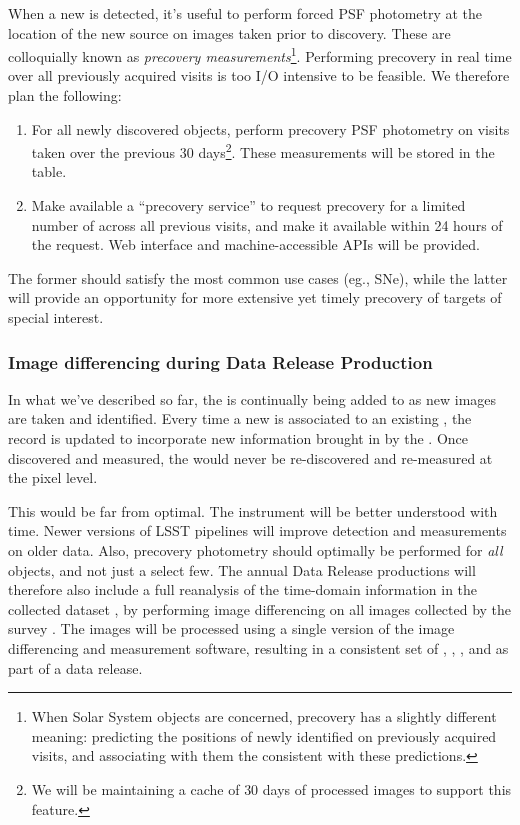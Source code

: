 When a new \DIASource is detected, it's useful to perform forced PSF photometry at the location of the new source on images taken prior to discovery. These are colloquially known as \emph{precovery measurements}\footnote{When Solar System objects are concerned, precovery has a slightly different meaning: predicting the positions of newly identified \SSObjects on previously acquired visits, and associating with them the \DIASources consistent with these predictions.}. Performing precovery in real time over all previously acquired visits is too I/O intensive to be feasible. We therefore plan the following:
\begin{enumerate}
\item For all newly discovered objects, perform precovery PSF photometry on visits taken over the previous 30 days\footnote{We will be maintaining a cache of $30$ days of processed images to support this feature.}. These measurements will be stored in the \DIAForcedSource table.
\item Make available a ``precovery service'' to request precovery for a limited number of \DIASources across all previous visits, and make it available within 24 hours of the request. Web interface and machine-accessible APIs will be provided.
\end{enumerate}

The former should satisfy the most common use cases (eg., SNe), while the latter will provide an opportunity for more extensive yet timely precovery of targets of special interest.

\subsubsection{Image differencing during Data Release Production}
\label{sec:l1dbreproc}

In what we've described so far, the \PPDB is continually being added to as new images are taken and \DIASources identified. Every time a new \DIASource is associated to an existing \DIAObject, the \DIAObject record is updated to incorporate new information brought in by the \DIASource. Once discovered and measured, the \DIASources would never be re-discovered and re-measured at the pixel level.

This would be far from optimal. The instrument will be better understood with time. Newer versions of LSST pipelines will improve detection and measurements on older data. Also, precovery photometry should optimally be performed for \emph{all} objects, and not just a select few.
The annual Data Release productions will therefore also include a full reanalysis of the time-domain information in the collected dataset , by performing image differencing on all images collected by the survey . The images will be processed using a single version of the image differencing and measurement software, resulting in a consistent set of \DIASources, \DIAObjects, \ForcedSources, and \SSObjects as part of a data release.


